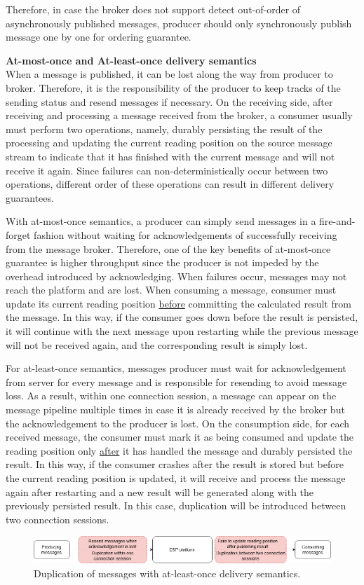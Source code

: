 Therefore, in case the broker does not support detect out-of-order of asynchronously published messages, producer should only synchronously publish message one by one for ordering guarantee.


\textbf{At-most-once and At-least-once delivery semantics}\\
When a message is published, it can be lost along the way from producer to broker. Therefore, it is the responsibility of the producer to keep tracks of the sending status and resend messages if necessary. On the receiving side, after receiving and processing a message received from the broker, a consumer usually must perform two operations, namely, durably persisting the result of the processing and updating the current reading position on the source message stream to indicate that it has finished with the current message and will not receive it again. Since failures can non-deterministically occur between two operations, different order of these operations can result in different delivery guarantees. 

With at-most-once semantics, a producer can simply send messages in a fire-and-forget fashion without waiting for acknowledgements of successfully receiving from the message broker. Therefore, one of the key benefits of at-most-once guarantee is higher throughput since the producer is not impeded by the overhead introduced by acknowledging. When failures occur, messages may not reach the platform and are lost. When consuming a message, consumer must update its current reading position \underline{before} committing the calculated result from the message. In this way, if the consumer goes down before the result is persisted, it will continue with the next message upon restarting while the previous message will not be received again, and the corresponding result is simply lost.

For at-least-once semantics, messages producer must wait for acknowledgement from server for every message and is responsible for resending to avoid message loss. As a result, within one connection session, a message can appear on the message pipeline multiple times in case it is already received by the broker but the acknowledgement to the producer is lost. On the consumption side, for each received message, the consumer must mark it as being consumed and update the reading position only \underline{after} it has handled the message and durably persisted the result. In this way, if the consumer crashes after the result is stored but before the current reading position is updated, it will receive and process the message again after restarting and a new result will be generated along with the previously persisted result. In this case, duplication will be introduced between two connection sessions.
\begin{figure}[h]
	\centering
	\includegraphics[width=\linewidth]{images/at-least-once-duplication.png}
	\caption{Duplication of messages with at-least-once delivery semantics.}
	\label{fig:messageduplication}
\end{figure}

